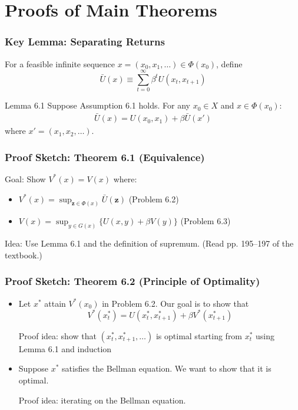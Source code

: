 \documentclass[9pt,aspectratio=169]{beamer}
\begin{document}
\section{Proofs of Main Theorems}

\begin{frame}
\frametitle{Key Lemma: Separating Returns}

For a feasible infinite sequence $x = (x_0, x_{1}, \ldots) \in \Phi(x_0)$,
define
\begin{equation*}
    \bar{U}(x) \equiv \sum_{t=0}^{\infty} \beta^t U(x_t, x_{t+1})
\end{equation*}

\begin{block}{Lemma 6.1}
Suppose Assumption 6.1 holds. For any $x_0 \in X$ and $x \in \Phi(x_0)$:
\begin{align*}
\bar{U}(x) = U(x_0, x_{1}) + \beta \bar{U}(x')
\end{align*}
where $x' = (x_{1}, x_{2}, \ldots)$.
\end{block}

\end{frame}

\begin{frame}
\frametitle{Proof Sketch: Theorem 6.1 (Equivalence)}

Goal: Show $V^*(x) = V(x)$ where:
\begin{itemize}
    \item $V^*(x) = \sup_{\mathbf{z} \in \Phi(x)} \bar{U}(\mathbf{z})$
    (Problem 6.2)
    \item $V(x) = \sup_{y \in G(x)} \{U(x,y) + \beta V(y)\}$ (Problem 6.3)
\end{itemize}

Idea: Use Lemma 6.1 and the definition of supremum. (Read pp. 195--197 of the
textbook.)

\end{frame}

\begin{frame}
\frametitle{Proof Sketch: Theorem 6.2 (Principle of Optimality)}

\begin{itemize}
    \item Let $x^*$ attain $V^*(x_0)$ in Problem 6.2. Our goal is to show
    that $$V^*(x^*_t) = U(x^*_t, x^*_{t+1}) + \beta V^*(x^*_{t+1})$$

    Proof idea: show that $(x^*_t, x^*_{t+1}, \ldots)$ is optimal starting
    from $x^*_t$ using Lemma 6.1 and induction
    \item Suppose $x^*$ satisfies the Bellman equation. We want to show that
    it is optimal.

    Proof idea: iterating on the Bellman equation.
\end{itemize}
\end{frame}
\end{document}
